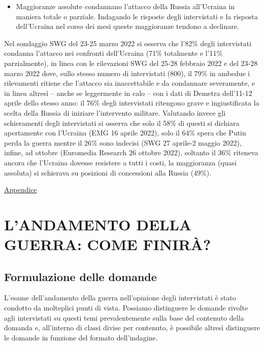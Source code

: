 \documentclass[
]{book}
\providecommand{\tightlist}{%
  \setlength{\itemsep}{0pt}\setlength{\parskip}{0pt}}
\begin{document}
\begin{itemize}
\tightlist
\item
  Maggioranze assolute condannano l'attacco della Russia all'Ucraina in maniera totale o parziale. Indagando le risposte degli intervistati e la risposta dell'Ucraina nel corso dei mesi queste maggioranze tendono a declinare.
\end{itemize}

Nel sondaggio SWG del 23-25 marzo 2022 si osserva che l'82\% degli intervistati condanna l'attacco nei confronti dell'Ucraina (71\% totalmente e l'11\% parzialmente), in linea con le rilevazioni SWG del 25-28 febbraio 2022 e del 23-28 marzo 2022 dove, sullo stesso numero di intervistati (800), il 79\% in ambedue i rilevamenti ritiene che l'attacco sia inaccettabile e da condannare severamente, e in linea altresì -- anche se leggermente in calo -- con i dati di Demetra dell'11-12 aprile dello stesso anno: il 76\% degli intervistati ritengono grave e ingiustificata la scelta della Russia di iniziare l'intervento militare. Valutando invece gli schieramenti degli intervistati si osserva che solo il 58\% di questi si dichiara apertamente con l'Ucraina (EMG 16 aprile 2022), solo il 64\% spera che Putin perda la guerra mentre il 26\% sono indecisi (SWG 27 aprile-2 maggio 2022), infine, ad ottobre (Euromedia Research 26 ottobre 2022), soltanto il 36\% riteneva ancora che l'Ucraina dovesse resistere a tutti i costi, la maggioranza (quasi assoluta) si schierava su posizioni di concessioni alla Russia (49\%).

\href{https://github.com/LucianaFazio/Ucrania/blob/main/PDF_Appendice/III.\%20Le\%20cause\%20della\%20guerra_v.5.pdf}{Appendice}

\hypertarget{landamento-della-guerra-come-finiruxe0}{%
\chapter{L'ANDAMENTO DELLA GUERRA: COME FINIRÀ?}\label{landamento-della-guerra-come-finiruxe0}}

\hypertarget{formulazione-delle-domande-2}{%
\section{Formulazione delle domande}\label{formulazione-delle-domande-2}}

L'esame dell'andamento della guerra nell'opinione degli intervistati è stato condotto da molteplici punti di vista. Possiamo distinguere le domande rivolte agli intervistati su questi temi prevalentemente sulla base del contenuto della domanda e, all'interno di classi divise per contenuto, è possibile altresì distinguere le domande in funzione del formato dell'indagine.
\end{document}
